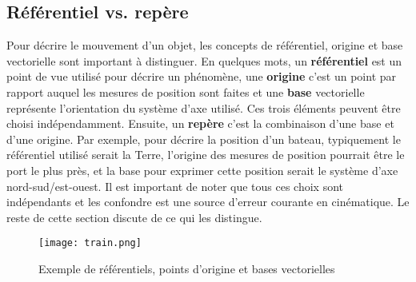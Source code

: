 \subsection{Référentiel vs. repère}
Pour décrire le mouvement d'un objet, les concepts de référentiel, origine et base vectorielle sont important à distinguer. En quelques mots, un \textbf{référentiel} est un point de vue utilisé pour décrire un phénomène, une \textbf{origine} c'est un point par rapport auquel les mesures de position sont faites et une \textbf{base} vectorielle représente l'orientation du système d'axe utilisé. Ces trois éléments peuvent être choisi indépendamment.  Ensuite, un \textbf{repère} c'est la combinaison d'une base et d'une origine. Par exemple, pour décrire la position d'un bateau, typiquement le référentiel utilisé serait la Terre, l'origine des mesures de position pourrait être le port le plus près, et la base pour exprimer cette position serait le système d'axe nord-sud/est-ouest. Il est important de noter que tous ces choix sont indépendants et les confondre est une source d'erreur courante en cinématique. Le reste de cette section discute de ce qui les distingue.

\begin{figure}[H]
	\centering
		\texttt{[image: train.png]}
	\caption{Exemple de référentiels, points d'origine et bases vectorielles}
	\label{fig:train}
\end{figure}

